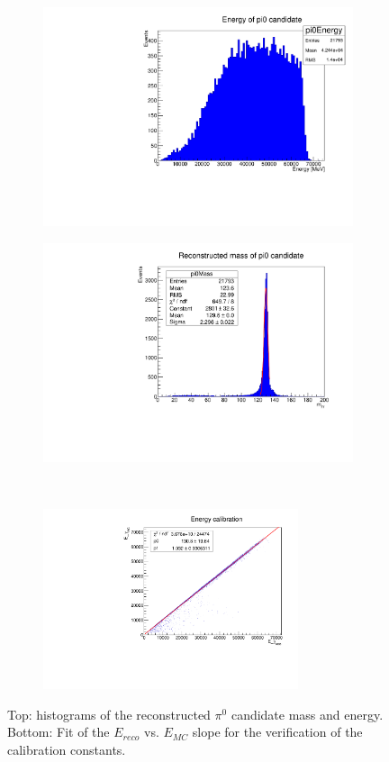 \begin{figure}
\begin{subfigure}{0.5\textwidth}
\includegraphics[width=\textwidth]{energypi0}
\end{subfigure}
\begin{subfigure}{0.5\textwidth}
\includegraphics[width=\textwidth]{masspi0}
\end{subfigure}\\
\begin{subfigure}{\textwidth}
\includegraphics[width=\textwidth,height=150pt]{calibpi0}
\end{subfigure}
\caption{Top: histograms of the reconstructed $\pi^0$ candidate mass and energy. Bottom:
Fit of the $E_{reco}$ vs. $E_{MC}$ slope for the verification of the
calibration constants.}\label{pi0validation}
\end{figure}


